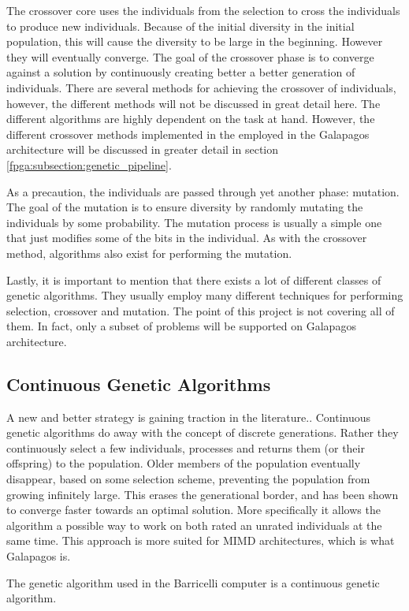 The crossover core uses the individuals from the selection to cross the individuals to produce new individuals.
Because of the initial diversity in the initial population, this will cause the diversity to be large in the beginning.
However they will eventually converge.
The goal of the crossover phase is to converge against a solution by continuously creating better a better generation of individuals.
There are several methods for achieving the crossover of individuals, however, the different methods will not be discussed in great detail here.
The different algorithms are highly dependent on the task at hand.
However, the different crossover methods implemented in the employed in the Galapagos architecture will be discussed in greater detail in section \vref{fpga:subsection:genetic_pipeline}.

As a precaution, the individuals are passed through yet another phase: mutation.
The goal of the mutation is to ensure diversity by randomly mutating the individuals by some probability.
The mutation process is usually a simple one that just modifies some of the bits in the individual.
As with the crossover method, algorithms also exist for performing the mutation.


Lastly, it is important to mention that there exists a lot of different classes of genetic algorithms.
They usually employ many different techniques for performing selection, crossover and mutation.
The point of this project is not covering all of them.
In fact, only a subset of problems will be supported on Galapagos architecture.




\subsection{Continuous Genetic Algorithms}
A new and better strategy is gaining traction in the literature..
Continuous genetic algorithms do away with the concept of discrete generations.
Rather they continuously select a few individuals, processes and returns them (or their offspring) to the population.
Older members of the population eventually disappear, based on some selection scheme, preventing the population from growing infinitely large.
This erases the generational border, and has been shown to converge faster towards an optimal solution.
More specifically it allows the algorithm a possible way to work on both rated an unrated individuals at the same time.
This approach is more suited for MIMD architectures, which is what Galapagos is.

The genetic algorithm used in the Barricelli computer is a continuous genetic algorithm.


